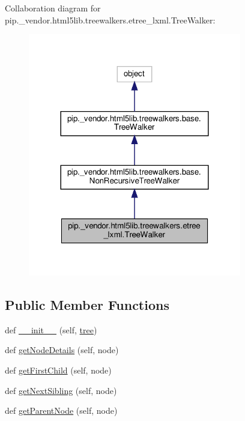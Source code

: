 Collaboration diagram for pip.\+\_\+vendor.\+html5lib.\+treewalkers.\+etree\+\_\+lxml.\+Tree\+Walker\+:
\nopagebreak
\begin{figure}[H]
\begin{center}
\leavevmode
\includegraphics[width=264pt]{classpip_1_1__vendor_1_1html5lib_1_1treewalkers_1_1etree__lxml_1_1TreeWalker__coll__graph}
\end{center}
\end{figure}
\subsection*{Public Member Functions}
\begin{DoxyCompactItemize}
\item 
def \hyperlink{classpip_1_1__vendor_1_1html5lib_1_1treewalkers_1_1etree__lxml_1_1TreeWalker_aa27b16556f9fbd04c03790edb8a119d4}{\+\_\+\+\_\+init\+\_\+\+\_\+} (self, \hyperlink{classpip_1_1__vendor_1_1html5lib_1_1treewalkers_1_1base_1_1TreeWalker_a687cbb77f22cf4bd25d91dc52e8da681}{tree})
\item 
def \hyperlink{classpip_1_1__vendor_1_1html5lib_1_1treewalkers_1_1etree__lxml_1_1TreeWalker_ab346503f96e7239dca328e9354586b5a}{get\+Node\+Details} (self, node)
\item 
def \hyperlink{classpip_1_1__vendor_1_1html5lib_1_1treewalkers_1_1etree__lxml_1_1TreeWalker_a31c32d72264e23f58f5af85ce8f04ce5}{get\+First\+Child} (self, node)
\item 
def \hyperlink{classpip_1_1__vendor_1_1html5lib_1_1treewalkers_1_1etree__lxml_1_1TreeWalker_a29c0b31a80d86cab309123d3440f60ad}{get\+Next\+Sibling} (self, node)
\item 
def \hyperlink{classpip_1_1__vendor_1_1html5lib_1_1treewalkers_1_1etree__lxml_1_1TreeWalker_ae29d4d1f3c17b6fdadec8eda5a4689b8}{get\+Parent\+Node} (self, node)
\end{DoxyCompactItemize}
